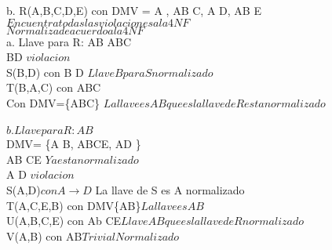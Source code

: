 \documentclass{article}
\begin{document}
\begin{enumerate}
b. R(A,B,C,D,E) con DMV = { A \rightarrow\rightarrowB, AB \rightarrow C, A \rightarrow D, AB \rightarrow E}\\
$Encuentra todas las violaciones a la 4NF$\\
$Normaliza de acuerdo a la 4NF$\\
a. Llave para R: AB
AB\rightarrow\rightarrow C\\
B\rightarrow D $ violacion$\\
S(B,D) con B \rightarrow D $ Llave B para S normalizado$\\
T(B,A,C) con AB\rightarrow\rightarrow C\\
Con DMV=\{AB\rightarrow\rightarrow C\} $ La llave es AB que es la llave de R esta normalizado$\\
\\
$b. Llave para R: AB$\\
DMV= \{A \rightarrow\rightarrow B, AB\rightarrow CE,  A\rightarrow D \}\\
AB \rightarrow CE $ Ya esta normalizado$\\
A \rightarrow D $ violacion$\\
S(A,D)$ con A\rightarrow D$ La llave de S es A normalizado\\
T(A,C,E,B) con DMV\{A\rightarrow\rightarrow B\}$ La llave es AB$\\
U(A,B,C,E) con Ab \rightarrow CE$ Llave AB que es la llave de R normalizado$\\
V(A,B) con A\rightarrow\rightarrow B$ Trivial Normalizado$\\
\end{enumerate}
\end{document}
